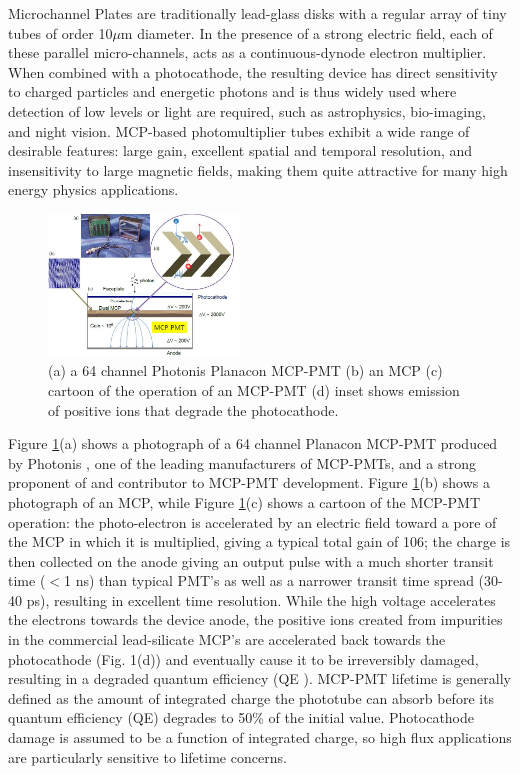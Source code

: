 
Microchannel Plates are traditionally lead-glass disks with a regular array of tiny tubes of order 10$\mu$m diameter. In the presence of a strong electric field, each of these parallel micro-channels, acts as a continuous-dynode electron multiplier. When combined with a photocathode, the resulting device has direct sensitivity to charged particles and energetic photons and is thus widely used where detection of low levels or light are required, such as astrophysics, bio-imaging, and night vision. MCP-based photomultiplier tubes exhibit a wide range of desirable features: large gain, excellent spatial and temporal resolution, and insensitivity to large magnetic fields, making them quite attractive for many high energy physics applications.

\begin{figure}[htb]
\centering
\includegraphics[width=0.45\textwidth]{images/figure1Brandt.jpg}
\caption[]{(a) a 64 channel Photonis Planacon MCP-PMT (b) an MCP (c) cartoon of the operation of an MCP-PMT (d) inset shows emission of positive ions that degrade the photocathode.}
\label{fig:PlanCon}
\end{figure}

Figure \ref{fig:PlanCon}(a) shows a photograph of a 64 channel Planacon MCP-PMT produced by Photonis \cite{incom}, one of the leading manufacturers of MCP-PMTs, and a strong proponent of and contributor to MCP-PMT development. Figure \ref{fig:PlanCon}(b) shows a photograph of an MCP, while Figure \ref{fig:PlanCon}(c) shows a cartoon of the MCP-PMT operation: the photo-electron is accelerated by an electric field toward a pore of the MCP in which it is multiplied, giving a typical total gain of 106; the charge is then collected on the anode giving an output pulse with a much shorter transit time ($<$1 ns) than typical PMT's as well as a narrower transit time spread (30-40 ps), resulting in excellent time resolution.   While the high voltage accelerates the electrons towards the device anode, the positive ions created from impurities in the commercial lead-silicate MCP's are accelerated back towards the photocathode (Fig. 1(d)) and eventually cause it to be irreversibly damaged, resulting in a degraded quantum efficiency (QE ). MCP-PMT lifetime is generally defined as the amount of integrated charge the phototube can absorb before its quantum efficiency (QE) degrades to 50\% of the initial value\cite{life}.  Photocathode damage is assumed to be a function of integrated charge, so high flux applications are particularly sensitive to lifetime concerns.  

